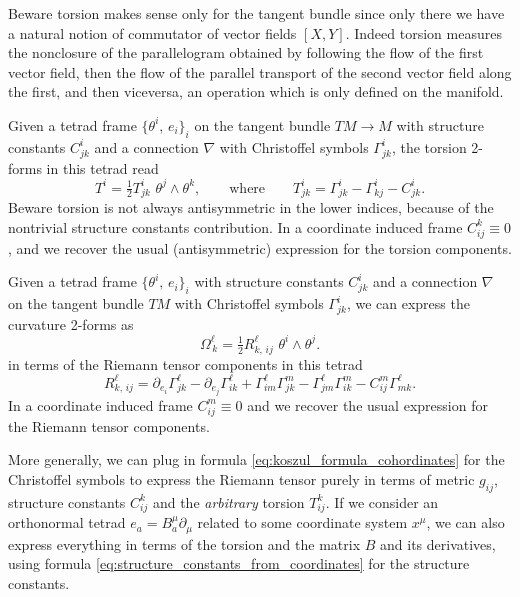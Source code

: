 \begin{mytheorem}
%
Beware torsion makes sense only for the tangent bundle since only there we have a natural notion of commutator of vector fields $[X,Y]$.
Indeed torsion measures the nonclosure of the parallelogram obtained by following the flow of the first vector field, then the flow of the parallel transport of the second vector field along the first, and then viceversa, an operation which is only defined on the manifold.

Given a tetrad frame \(\{\theta^i,\, e_i\}_i\) on the tangent bundle \(TM\to M\) with structure constants \(C^i_{jk}\) and a connection \(\nabla\) with Christoffel symbols \(\Gamma^i_{jk}\), the torsion 2-forms in this tetrad read
\begin{equation}
    T^i = \tfrac{1}{2} T^i_{jk} \,\, \theta^j \wedge \theta^k,
    \qquad \text{where}\qquad
    T^i_{jk} = \Gamma^i_{jk} - \Gamma^i_{kj} - C^i_{jk}.
\end{equation}
Beware torsion is not always antisymmetric in the lower indices, because of the nontrivial structure constants contribution.
In a coordinate induced frame $C_{ij}^k\equiv0$, and we recover the usual (antisymmetric) expression for the torsion components.
%
\end{mytheorem}


\begin{mytheorem}
%
Given a tetrad frame \(\{\theta^i,\, e_i\}_i\) with structure constants \(C^i_{jk}\) and a connection $\nabla$ on the tangent bundle $TM$ with Christoffel symbols \(\Gamma^i_{jk}\), we can express the curvature 2-forms as
\begin{equation}
    \Omega^\ell_{\, k} = \tfrac{1}{2} R^\ell_{k,\,ij} \,\, \theta^i \wedge \theta^j.
\end{equation}
in terms of the Riemann tensor components in this tetrad 
\begin{equation}
    R^\ell_{k,\,ij} = \partial_{e_i} \Gamma^\ell_{j k} - \partial_{e_j} \Gamma^\ell_{i k} + \Gamma^\ell_{i m} \Gamma^m_{j k} - \Gamma^\ell_{j m} \Gamma^m_{i k} - C^m_{ij} \Gamma^\ell_{m k}.
\end{equation}
In a coordinate induced frame $C_{ij}^m\equiv0$ and we recover the usual expression for the Riemann tensor components.

More generally, we can plug in formula \eqref{eq:koszul_formula_cohordinates} for the Christoffel symbols to express the Riemann tensor purely in terms of metric $g_{ij}$, structure constants $C_{ij}^k$ and the \emph{arbitrary} torsion $T_{ij}^k$.
%
If we consider an orthonormal tetrad $e_a = B_a^\mu \partial_\mu$ related to some coordinate system $x^\mu$, we can also express everything in terms of the torsion and the matrix $B$ and its derivatives, using formula \eqref{eq:structure_constants_from_coordinates} for the structure constants.
\end{mytheorem}




